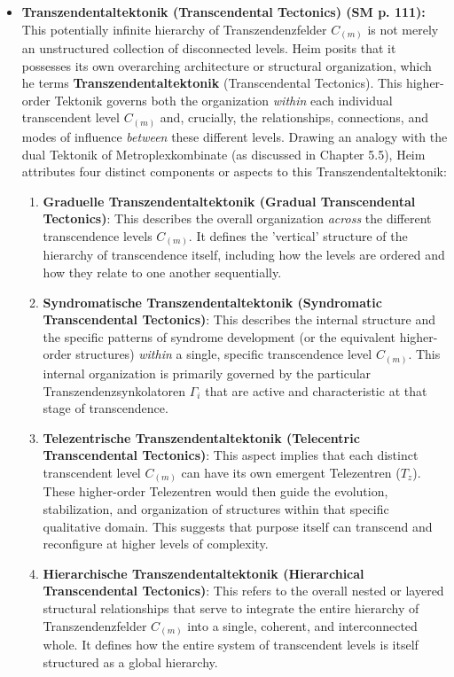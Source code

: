 \documentclass[12pt]{article}
\newcommand{\telezentrum}{T_z}
\begin{document}
\begin{itemize}
    \item \textbf{Transzendentaltektonik (Transcendental Tectonics) (SM p. 111):}
    This potentially infinite hierarchy of Transzendenzfelder \( C_{(m)} \) is not merely an unstructured collection of disconnected levels. Heim posits that it possesses its own overarching architecture or structural organization, which he terms \textbf{Transzendentaltektonik} (Transcendental Tectonics). This higher-order Tektonik governs both the organization \textit{within} each individual transcendent level \( C_{(m)} \) and, crucially, the relationships, connections, and modes of influence \textit{between} these different levels. Drawing an analogy with the dual Tektonik of Metroplexkombinate (as discussed in Chapter 5.5), Heim attributes four distinct components or aspects to this Transzendentaltektonik:
    \begin{enumerate}
        \item \textbf{Graduelle Transzendentaltektonik (Gradual Transcendental Tectonics)}: This describes the overall organization \textit{across} the different transcendence levels \( C_{(m)} \). It defines the 'vertical' structure of the hierarchy of transcendence itself, including how the levels are ordered and how they relate to one another sequentially.
        \item \textbf{Syndromatische Transzendentaltektonik (Syndromatic Transcendental Tectonics)}: This describes the internal structure and the specific patterns of syndrome development (or the equivalent higher-order structures) \textit{within} a single, specific transcendence level \( C_{(m)} \). This internal organization is primarily governed by the particular Transzendenzsynkolatoren \( \Gamma_i \) that are active and characteristic at that stage of transcendence.
        \item \textbf{Telezentrische Transzendentaltektonik (Telecentric Transcendental Tectonics)}: This aspect implies that each distinct transcendent level \( C_{(m)} \) can have its own emergent Telezentren (\(\telezentrum\)). These higher-order Telezentren would then guide the evolution, stabilization, and organization of structures within that specific qualitative domain. This suggests that purpose itself can transcend and reconfigure at higher levels of complexity.
        \item \textbf{Hierarchische Transzendentaltektonik (Hierarchical Transcendental Tectonics)}: This refers to the overall nested or layered structural relationships that serve to integrate the entire hierarchy of Transzendenzfelder \( C_{(m)} \) into a single, coherent, and interconnected whole. It defines how the entire system of transcendent levels is itself structured as a global hierarchy.
    \end{enumerate}


\end{itemize}
\end{document}
